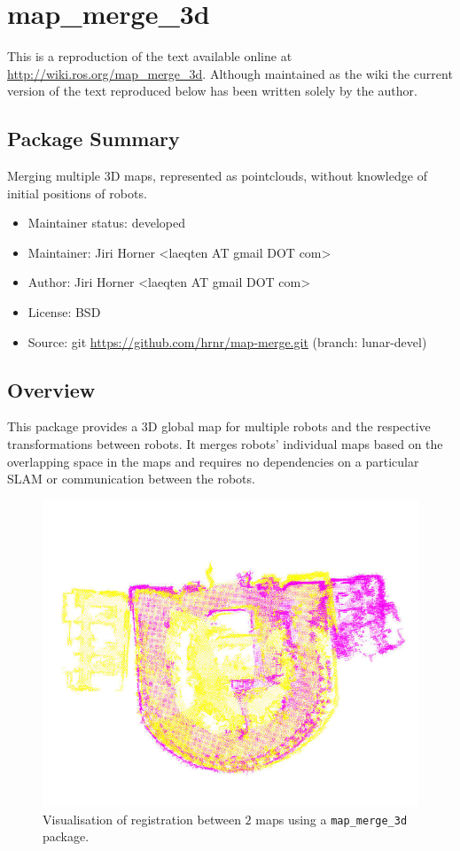 \chapter{map\_merge\_3d}
\label{chap:map_merge-wiki}

This is a reproduction of the text available online at \url{http://wiki.ros.org/map_merge_3d}. Although maintained as the wiki the current version of the text reproduced below has been written solely by the author.

\section{Package Summary}

Merging multiple 3D maps, represented as pointclouds, without knowledge of initial positions of robots.

\begin{itemize}
    \item Maintainer status: developed
    \item Maintainer: Jiri Horner \textless laeqten AT gmail DOT com\textgreater
    \item Author: Jiri Horner \textless laeqten AT gmail DOT com\textgreater
    \item License: BSD
    \item Source: git \url{https://github.com/hrnr/map-merge.git} (branch: lunar-devel)
\end{itemize}


\section{Overview}

This package provides a 3D global map for multiple robots and the respective transformations between robots. It merges robots' individual maps based on the overlapping space in the maps and requires no dependencies on a particular \gls{SLAM} or communication between the robots.

\begin{figure}
    \centering
    \includegraphics[width=4.53in]{../img/screenshot.jpg}
    \caption[The merged map for $2$ robots.]{Visualisation of registration between $2$ maps using a \texttt{map\_merge\_3d} package.}
    \label{fig:mapmergescreenshot}
\end{figure}

